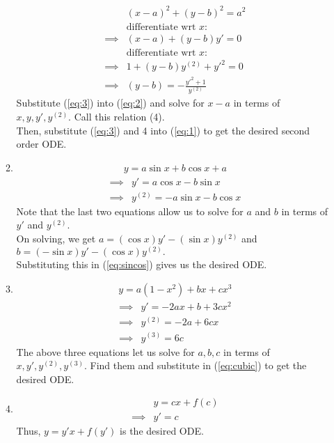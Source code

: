 \documentclass[12pt]{article}
\theoremstyle{definition}
\numberwithin{thm}{section}
\begin{document}
\begin{enumerate}[leftmargin=*, label = Q.\arabic*.]
\begin{enumerate}[label = (\roman*)]
\begin{align}
			& (x - a)^2 + (y - b)^2 = a^2 \label{eq:1}\\
			&\text{differentiate wrt } x: \nonumber\\
			\implies & (x - a) + (y - b)y' = 0 \label{eq:2}\\
			&\text{differentiate wrt } x: \nonumber\\
			\implies & 1 + (y - b)y^{(2)} + y'^2 = 0 \nonumber\\
			\implies & (y - b) = -\frac{y'^2 + 1}{y^{(2)}} \label{eq:3}
		\end{align}
		Substitute (\ref{eq:3}) into (\ref{eq:2}) and solve for $x - a$ in terms of $x, y, y', y^{(2)}.$ Call this relation (4).\\
		Then, substitute (\ref{eq:3}) and 4 into (\ref{eq:1}) to get the desired second order ODE.
		\item 
		\begin{align} \label{eq:sincos}
			y = a\sin x + b\cos x + a
		\end{align}
		\begin{align*} 
			\implies & y' = a\cos x - b\sin x\\
			\implies & y^{(2)} = -a\sin x - b\cos x
		\end{align*}
		Note that the last two equations allow us to solve for $a$ and $b$ in terms of $y'$ and $y^{(2)}.$\\
		On solving, we get $a = (\cos x)y' - (\sin x)y^{(2)}$ and $b = (-\sin x)y' - (\cos x)y^{(2)}.$\\
		Substituting this in (\ref{eq:sincos}) gives us the desired ODE.
		\item 
		\begin{align} \label{eq:cubic}
			y = a(1 - x^2) + bx + cx^3
		\end{align}
		\begin{align*} 
			\implies & y' = -2ax + b + 3cx^2\\
			\implies & y^{(2)} = -2a + 6cx\\
			\implies & y^{(3)} = 6c
		\end{align*}
		The above three equations let us solve for $a, b, c$ in terms of $x, y', y^{(2)}, y^{(3)}.$ Find them and substitute in (\ref{eq:cubic}) to get the desired ODE.
		\item 
		\begin{align*} 
			& y = cx + f(c)\\
			\implies & y' = c
		\end{align*}
		Thus, $y = y'x + f(y')$ is the desired ODE.
	\end{enumerate}

\end{enumerate}
\end{document}
